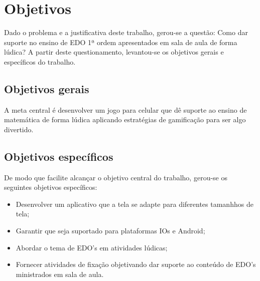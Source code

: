 \chapter[Objetivos]{Objetivos}
Dado o problema e a justificativa deste trabalho, gerou-se a questão: Como dar suporte no ensino de EDO 1ª ordem apresentados em sala de aula de forma lúdica? A partir deste questionamento, levantou-se os objetivos gerais e específicos do trabalho.

\section[Objetivos gerais]{Objetivos gerais}
A meta central é desenvolver um jogo para celular que dê suporte ao ensino de matemática de forma lúdica aplicando estratégias de gamificação para ser algo divertido. 

\section[Objetivos específicos]{Objetivos específicos}

De modo que facilite alcançar o objetivo central do trabalho, gerou-se os seguintes objetivos específicos:
\begin{itemize}[]

\item Desenvolver um aplicativo que a tela se adapte para diferentes tamanhhos de tela;
\item Garantir que seja suportado para plataformas IOs e Android;
\item Abordar o tema de EDO's em atividades lúdicas;
\item Fornecer atividades de fixação objetivando dar suporte ao conteúdo de EDO's ministrados em sala de aula.

\end{itemize}
